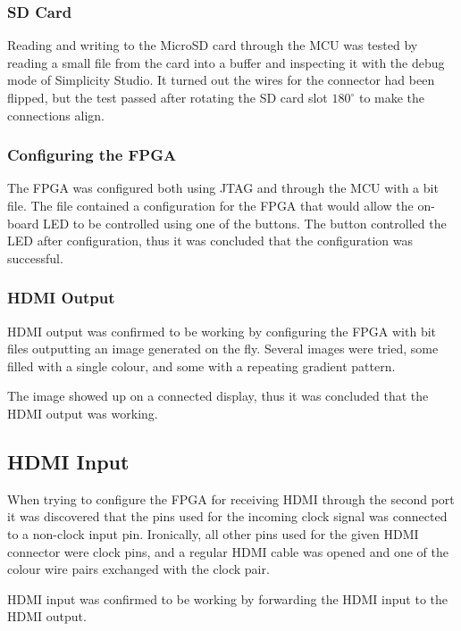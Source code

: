 \subsubsection{SD Card}
Reading and writing to the MicroSD card through the MCU was tested by reading a small file from the card into a buffer and inspecting it with the debug mode of Simplicity Studio. It turned out the wires for the connector had been flipped, but the test passed after rotating the SD card slot $180^{\circ}$ to make the connections align.

\subsubsection{Configuring the FPGA}
The FPGA was configured both using JTAG and through the MCU with a bit file. The file contained a configuration for the FPGA that would allow the on-board LED to be controlled using one of the buttons. The button controlled the LED after configuration, thus it was concluded that the configuration was successful.

\subsubsection{HDMI Output}
HDMI output was confirmed to be working by configuring the FPGA with bit files outputting an image generated on the fly.
Several images were tried, some filled with a single colour, and some with a repeating gradient pattern.

The image showed up on a connected display, thus it was concluded that the HDMI output was working.

\subsection{HDMI Input}
When trying to configure the FPGA for receiving HDMI through the second port it was discovered that the pins used for the incoming clock signal was connected to a non-clock input pin.
Ironically, all other pins used for the given HDMI connector were clock pins, and a regular HDMI cable was opened and one of the colour wire pairs exchanged with the clock pair.

HDMI input was confirmed to be working by forwarding the HDMI input to the HDMI output.
